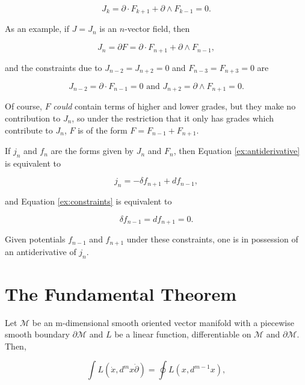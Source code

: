 \documentclass{article}
\begin{document}
\begin{equation}
  J_k = \partial \cdot F_{k+1} + \partial \wedge F_{k-1} = 0.\label{eq:constraints}
\end{equation}

As an example, if $J = J_n$ is an $n$-vector field, then 

\begin{equation}
  J_n = \partial F = \partial \cdot F_{n+1} + \partial \wedge F_{n-1},\label{ex:antiderivative}
\end{equation}

and the constraints due to $J_{n-2} = J_{n+2} = 0$ and $F_{n-3} = F_{n+3} = 0$ are

\begin{equation}
  J_{n-2} = \partial \cdot F_{n-1} = 0 \text{ and } J_{n+2} = \partial \wedge F_{n+1} = 0.\label{ex:constraints}
\end{equation}

Of course, $F$ \emph{could} contain terms of higher and lower grades, but they make no contribution to $J_n$, so under the restriction that it only has grades which contribute to $J_n$, $F$ is of the form $F = F_{n-1} + F_{n+1}$.

If $j_n$ and $f_n$ are the forms given by $J_n$ and $F_n$, then Equation \ref{ex:antiderivative} is equivalent to

\begin{equation}
  j_n = -\delta f_{n+1} + d f_{n-1},
\end{equation}

and Equation \ref{ex:constraints} is equivalent to

\begin{equation}
  \delta f_{n-1} = d f_{n+1} = 0.
\end{equation}

Given potentials $f_{n-1}$ and $f_{n+1}$ under these constraints, one is in possession of an antiderivative of $j_n$.

\section{The Fundamental Theorem}

Let $\mathcal{M}$ be an m-dimensional smooth oriented vector manifold with a piecewise smooth boundary $\partial \mathcal{M}$ and $L$ be a linear function, differentiable on $\mathcal{M}$ and $\partial \mathcal{M}$. Then, \cite{cagc} \cite{sobczyk} \cite{gap}

\begin{equation}
  \int L(\dot x, d^mx \dot \partial) = \oint L(x, d^{m-1}x),\label{eq:fundamental-theorem}
\end{equation}
\end{document}
